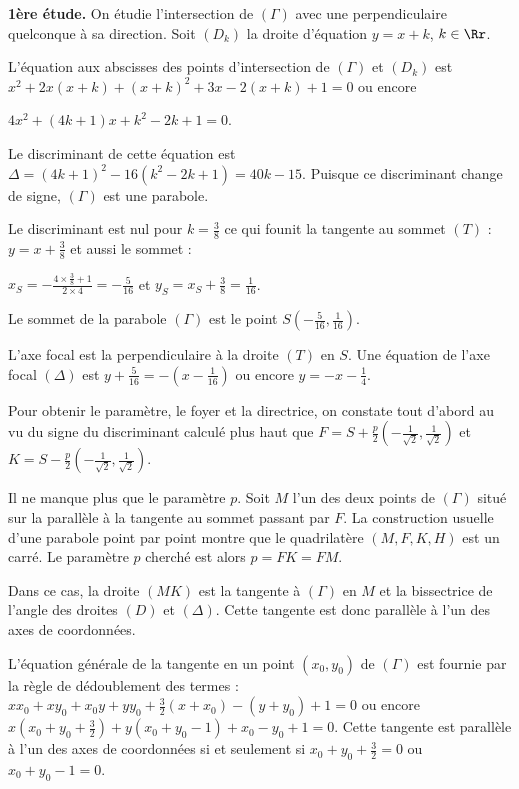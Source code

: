 {\begin{enumerate}
{\textbf{1ère étude.} On étudie l'intersection de $(\Gamma)$ avec une perpendiculaire quelconque à sa direction. Soit $(D_k)$ la droite d'équation $y = x+k$, $k\in\Rr$.

L'équation aux abscisses des points d'intersection de $(\Gamma)$ et $(D_k)$ est
$x^2+2x(x+k)+(x+k)^2+3x-2(x+k)+1=0$ ou encore 

\begin{center}
$4x^2+(4k+1)x+k^2-2k+1=0$.
\end{center}

Le discriminant de cette équation est $\Delta=(4k+1)^2-16(k^2-2k+1) = 40k-15$. Puisque ce discriminant change de signe, $(\Gamma)$ est une parabole.

Le discriminant est nul pour $k=\frac{3}{8}$ ce qui founit la tangente au sommet $(T)$ : $y=x+\frac{3}{8}$ et aussi le sommet :

\begin{center}
$x_S=-\frac{4\times\frac{3}{8}+1}{2\times4}= -\frac{5}{16}$  et $y_S =x_S+\frac{3}{8}=\frac{1}{16}$.
\end{center}

Le sommet de la parabole $(\Gamma)$ est le point $S\left(-\frac{5}{16},\frac{1}{16}\right)$.

L'axe focal est la perpendiculaire à la droite $(T)$ en $S$. Une équation de l'axe focal $(\Delta)$ est $y+\frac{5}{16}=-\left(x-\frac{1}{16}\right)$ ou encore $y = -x-\frac{1}{4}$.

Pour obtenir le paramètre, le foyer et la directrice, on constate tout d'abord au vu du signe du discriminant calculé plus haut que $F = S+\frac{p}{2}\left(-\frac{1}{\sqrt{2}},\frac{1}{\sqrt{2}}\right)$    et $K= S-\frac{p}{2}\left(-\frac{1}{\sqrt{2}},\frac{1}{\sqrt{2}}\right)$.

Il ne manque plus que le paramètre $p$. Soit $M$ l'un des deux points de $(\Gamma)$ situé sur la parallèle à la tangente au sommet passant par $F$. La construction usuelle d'une parabole point par point montre que le quadrilatère $(M,F,K,H)$ est un carré. Le paramètre $p$ cherché est alors $p=FK=FM$.

 
Dans ce cas, la droite $(MK)$ est la tangente à $(\Gamma)$ en $M$ et la bissectrice de l'angle des droites $(D)$ et $(\Delta)$. Cette tangente est donc parallèle à l'un des axes de coordonnées.

L'équation générale de la tangente en un point $(x_0,y_0)$ de $(\Gamma)$ est fournie par la règle de dédoublement des termes : $xx_0+xy_0+x_0y+yy_0+\frac{3}{2}(x+ x_0)-(y+y_0)+1=0$ ou encore $x\left(x_0+y_0+\frac{3}{2}\right)+y(x_0+y_0-1)+ x_0-y_0+1=0$. Cette tangente est parallèle à l'un des axes de coordonnées si et seulement si $x_0+y_0+\frac{3}{2}=0$ ou $x_0+y_0-1=0$.

}
\end{enumerate}}
